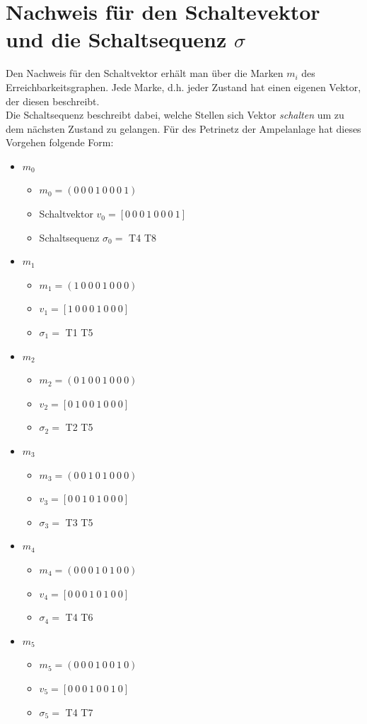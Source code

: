 \documentclass{article}
\begin{document}
	\section{Nachweis für den Schaltevektor und die Schaltsequenz $\sigma$}
		Den Nachweis für den Schaltvektor erhält man über die Marken $m_i$ des Erreichbarkeitsgraphen.
		Jede Marke, d.h. jeder Zustand hat einen eigenen Vektor, der diesen beschreibt.\\
		Die Schaltsequenz beschreibt dabei, welche Stellen sich Vektor \textit{schalten} um zu dem nächsten Zustand zu gelangen. Für des Petrinetz der Ampelanlage hat dieses Vorgehen folgende Form:
		\begin{itemize}
			\item $m_0$
			\begin{itemize}
				\item $m_0 = (0\ 0\ 0\ 1\ 0\ 0\ 0\ 1)$
				\item Schaltvektor $v_0 = [0\ 0\ 0\ 1\ 0\ 0\ 0\ 1]$
				\item Schaltsequenz $\sigma_0 =$ T4 T8
			\end{itemize}
			\item $m_1$
			\begin{itemize}
				\item $m_1 = (1\ 0\ 0\ 0\ 1\ 0\ 0\ 0)$
				\item $v_1 = [1\ 0\ 0\ 0\ 1\ 0\ 0\ 0]$
				\item $\sigma_1 =$ T1 T5
			\end{itemize}
			\item $m_2$
			\begin{itemize}
				\item $m_2 = (0\ 1\ 0\ 0\ 1\ 0\ 0\ 0)$
				\item $v_2 = [0\ 1\ 0\ 0\ 1\ 0\ 0\ 0]$
				\item $\sigma_2 =$ T2 T5
			\end{itemize}
			\item $m_3$
			\begin{itemize}
				\item $m_3 = (0\ 0\ 1\ 0\ 1\ 0\ 0\ 0)$
				\item $v_3 =[0\ 0\ 1\ 0\ 1\ 0\ 0\ 0]$
				\item $\sigma_3 =$ T3 T5
			\end{itemize}
			\item $m_4$
			\begin{itemize}
				\item $m_4 = (0\ 0\ 0\ 1\ 0\ 1\ 0\ 0)$
				\item $v_4 = [0\ 0\ 0\ 1\ 0\ 1\ 0\ 0]$
				\item $\sigma_4 =$ T4 T6		
			\end{itemize}
			\item $m_5$
			\begin{itemize}
				\item $m_5 = (0\ 0\ 0\ 1\ 0\ 0\ 1\ 0)$
				\item $v_5 = [0\ 0\ 0\ 1\ 0\ 0\ 1\ 0]$
				\item $\sigma_5 =$ T4 T7
			\end{itemize}
		\end{itemize}
		
\end{document}
